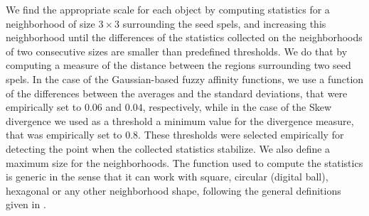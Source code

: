 \documentclass[10pt,twocolumn,letterpaper]{article}
\begin{document}
We find the appropriate scale for each object by computing statistics for a neighborhood of size $3 \times 3$ surrounding the seed spels, and increasing this neighborhood until the differences of the statistics collected on the neighborhoods of two consecutive sizes are smaller than predefined thresholds. We do that by computing a measure of the distance between the regions surrounding two seed spels. In the case of the Gaussian-based fuzzy affinity functions, we use a function of the differences between the averages and the standard deviations, that were empirically set to $0.06$ and $0.04$, respectively, while in the case of the Skew divergence we used as a threshold a minimum value for the divergence measure, that was empirically set to $0.8$. These thresholds were selected empirically for detecting the point when the collected statistics stabilize. We also define a maximum size for the neighborhoods. The function used to compute the statistics is generic in the sense that it can work with square, circular (digital ball), hexagonal or any other neighborhood shape, following the general definitions given in \cite{HERM98c}.




\end{document}
